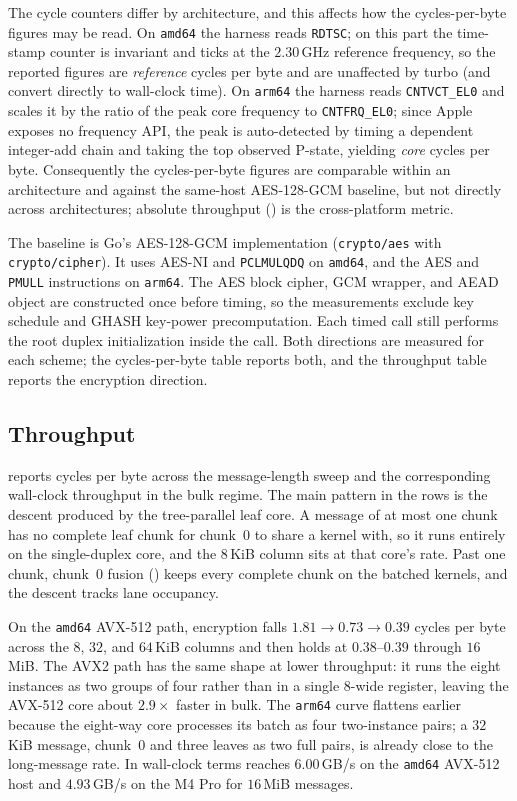 The cycle counters differ by architecture, and this affects how the
cycles-per-byte figures may be read. On \texttt{amd64} the harness reads
\texttt{RDTSC}; on this part the time-stamp counter is invariant and ticks at the
$2.30$\,GHz reference frequency, so the reported figures are \emph{reference}
cycles per byte and are unaffected by turbo (and convert directly to wall-clock
time). On \texttt{arm64} the harness reads \texttt{CNTVCT\_EL0} and scales it by
the ratio of the peak core frequency to \texttt{CNTFRQ\_EL0}; since Apple exposes
no frequency API, the peak is auto-detected by timing a dependent integer-add
chain and taking the top observed P-state, yielding \emph{core} cycles per byte.
Consequently the cycles-per-byte figures are comparable within an architecture
and against the same-host AES-128-GCM baseline, but not directly across
architectures; absolute throughput () is the cross-platform
metric.

The baseline is Go's AES-128-GCM implementation
(\texttt{crypto/\allowbreak aes} with \texttt{crypto/\allowbreak cipher}).
It uses AES-NI and \texttt{PCLMULQDQ} on \texttt{amd64}, and the AES
and \texttt{PMULL} instructions on \texttt{arm64}.
The AES block cipher, GCM wrapper, and \TW{} AEAD object are constructed once
before timing, so the measurements exclude key schedule and GHASH key-power
precomputation. Each timed \TW{} call still performs the root duplex
initialization inside the call. Both directions are measured for each scheme;
the cycles-per-byte table reports both, and the throughput table reports the
encryption direction.

\subsection{Throughput}
\label{sec:throughput}

 reports cycles per byte across the message-length sweep and
 the corresponding wall-clock throughput in the bulk
regime. The main pattern in the \TW{} rows is the descent produced by the
tree-parallel leaf core. A message of at most one chunk has no complete leaf
chunk for chunk~$0$ to share a kernel with, so it runs entirely on the
single-duplex core, and the $8$\,KiB column sits at that core's rate. Past one
chunk, chunk~$0$ fusion () keeps every complete chunk on the
batched kernels, and the descent tracks lane occupancy.

On the \texttt{amd64} AVX-512 path, \TW{} encryption falls
$1.81 \to 0.73 \to 0.39$ cycles per byte across the $8$, $32$, and $64$\,KiB
columns and then holds at $0.38$--$0.39$ through $16$\,MiB. The AVX2 path has
the same shape at lower throughput: it runs the eight instances as two groups
of four rather than in a single $8$-wide register, leaving the AVX-512 core
about $2.9\times$ faster in bulk. The \texttt{arm64} curve flattens earlier
because the eight-way core processes its batch as four two-instance pairs; a
$32$\,KiB message, chunk~$0$ and three leaves as two full pairs, is already
close to the long-message rate. In wall-clock terms \TW{} reaches
$6.00$\,GB/s on the \texttt{amd64} AVX-512 host and $4.93$\,GB/s on the M4 Pro
for $16$\,MiB messages.

